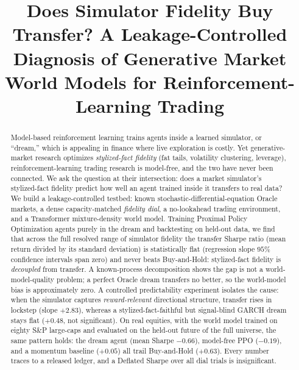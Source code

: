 \documentclass[conference]{IEEEtran}
\begin{document}
\title{Does Simulator Fidelity Buy Transfer? A Leakage-Controlled Diagnosis of Generative Market World Models for Reinforcement-Learning Trading}

\author{
}

\maketitle

\begin{abstract}
Model-based reinforcement learning trains agents inside a learned simulator, or ``dream,'' which is appealing in finance where live exploration is costly. Yet generative-market research optimizes \emph{stylized-fact fidelity} (fat tails, volatility clustering, leverage), reinforcement-learning trading research is model-free, and the two have never been connected. We ask the question at their intersection: does a market simulator's stylized-fact fidelity predict how well an agent trained inside it transfers to real data? We build a leakage-controlled testbed: known stochastic-differential-equation Oracle markets, a dense capacity-matched \emph{fidelity dial}, a no-lookahead trading environment, and a Transformer mixture-density world model. Training Proximal Policy Optimization agents purely in the dream and backtesting on held-out data, we find that across the full resolved range of simulator fidelity the transfer Sharpe ratio (mean return divided by its standard deviation) is statistically flat (regression slope $95\%$ confidence intervals span zero) and never beats Buy-and-Hold: stylized-fact fidelity is \emph{decoupled} from transfer. A known-process decomposition shows the gap is not a world-model-quality problem; a perfect Oracle dream transfers no better, so the world-model bias is approximately zero. A controlled predictability experiment isolates the cause: when the simulator captures \emph{reward-relevant} directional structure, transfer rises in lockstep (slope $+2.83$), whereas a stylized-fact-faithful but signal-blind GARCH dream stays flat ($+0.48$, not significant). On real equities, with the world model trained on eighty S\&P large-caps and evaluated on the held-out future of the full universe, the same pattern holds: the dream agent (mean Sharpe $-0.66$), model-free PPO ($-0.19$), and a momentum baseline ($+0.05$) all trail Buy-and-Hold ($+0.63$). Every number traces to a released ledger, and a Deflated Sharpe over all dial trials is insignificant.
\end{abstract}
\end{document}
